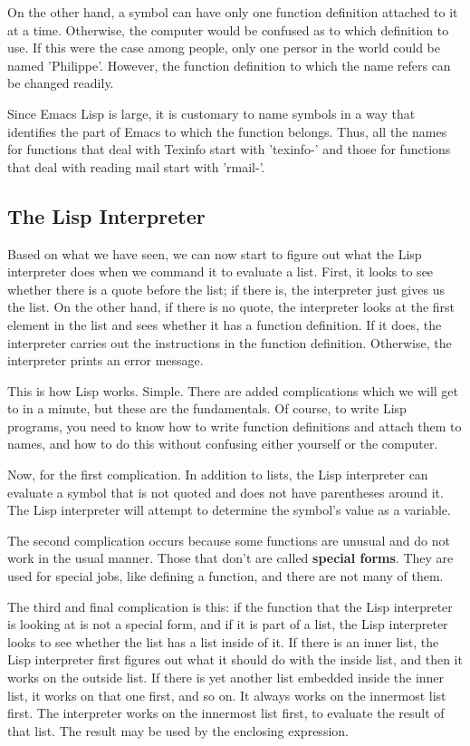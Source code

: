 \documentclass[12pt]{book}
\begin{document}
On the other hand, a symbol can have only one function definition attached to it at a time. Otherwise, the computer would be confused as to which definition to use. If this were the case among people, only one persor in the world could be named 'Philippe'. However, the function definition to which the name refers can be changed readily.

Since Emacs Lisp is large, it is customary to name symbols in a way that identifies the part of Emacs to which the function belongs. Thus, all the names for functions that deal with Texinfo start with 'texinfo-' and those for functions that deal with reading mail start with 'rmail-'.

\subsection{The Lisp Interpreter}
Based on what we have seen, we can now start to figure out what the Lisp interpreter does when we command it to evaluate a list. First, it looks to see whether there is a quote before the list; if there is, the interpreter just gives us the list. On the other hand, if there is no quote, the interpreter looks at the first element in the list and sees whether it has a function definition. If it does, the interpreter carries out the instructions in the function definition. Otherwise, the interpreter prints an error message.

This is how Lisp works. Simple. There are added complications which we will get to in a minute, but these are the fundamentals. Of course, to write Lisp programs, you need to know how to write function definitions and attach them to names, and how to do this without confusing either yourself or the computer.

Now, for the first complication. In addition to lists, the Lisp interpreter can evaluate a symbol that is not quoted and does not have parentheses around it. The Lisp interpreter will attempt to determine the symbol's value as a variable.

The second complication occurs because some functions are unusual and do not work in the usual manner. Those that don't are called {\bf special forms}. They are used for special jobs, like defining a function, and there are not many of them. 

The third and final complication is this: if the function that the Lisp interpreter is looking at is not a special form, and if it is part of a list, the Lisp interpreter looks to see whether the list has a list inside of it. If there is an inner list, the Lisp interpreter first figures out what it should do with the inside list, and then it works on the outside list. If there is yet another list embedded inside the inner list, it works on that one first, and so on. It always works on the innermost list first. The interpreter works on the innermost list first, to evaluate the result of that list. The result may be used by the enclosing expression.
\end{document}

